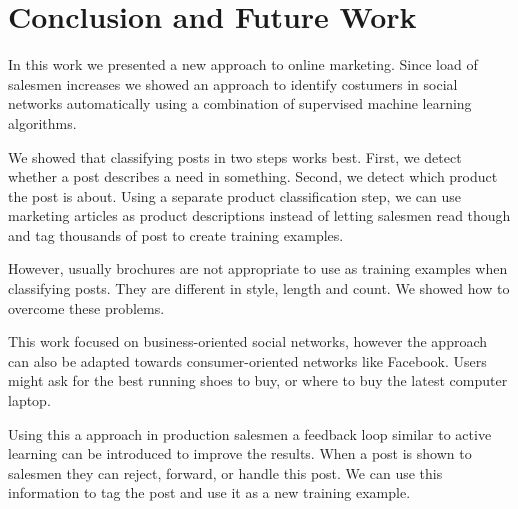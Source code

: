 \section{Conclusion and Future Work}
\label{sec:conclusion}

In this work we presented a new approach to online marketing. Since load of salesmen increases we showed an approach to identify costumers in social networks automatically using a combination of supervised machine learning algorithms.

We showed that classifying posts in two steps works best. 
First, we detect whether a post describes a need in something.
Second, we detect which product the post is about.
Using a separate product classification step, we can use marketing articles as product descriptions instead of letting salesmen read though and tag thousands of post to create training examples.

However, usually brochures are not appropriate to use as training examples when classifying posts.
They are different in style, length and count. 
We showed how to overcome these problems.

This work focused on business-oriented social networks, however the approach can also be adapted towards consumer-oriented networks like Facebook.
Users might ask for the best running shoes to buy, or where to buy the latest computer laptop.

Using this a approach in production salesmen a feedback loop similar to active learning can be introduced to improve the results. When a post is shown to salesmen they can reject, forward, or handle this post. We can use this information to tag the post and use it as a new training example.

